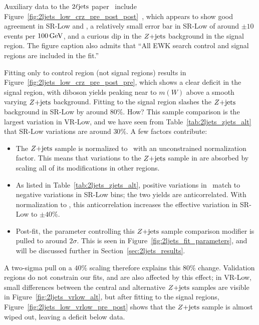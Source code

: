 Auxiliary data to the $\twoljets$ paper~\cite{atlas2022searches} include
Figure~\ref{fig:2ljets_low_crz_pre_post_post}~\cite{hepdata.116034.v1/t101},
which appears to show good agreement in SR-Low and \crz, a relatively
small error bar in SR-Low of around $\pm10$ events per $100\,\eV[G]$,
and a curious dip in the $\zjets$ background in the signal region.
The figure caption also admits that
``All EWK search control and signal regions are included in the fit.''

Fitting only to control region (not signal regions) results in
Figure~\ref{fig:2ljets_low_crz_pre_post_pre}, which shows a clear deficit in
the signal region, with diboson yields peaking near to $m(W)$ above a smooth
varying $\zjets$ background.
Fitting to the signal region slashes the $\zjets$ background in SR-Low by
around $80\%$. How?
This sample comparison is the largest variation in VR-Low, and we have seen
from Table~\ref{tab:2ljets_zjets_alt} that SR-Low variations are around $30\%$.
A few factors contribute:
\begin{itemize}
\item The $\zjets$ sample is normalized to \crz\ with an unconstrained
normalization factor. This means that variations to the $\zjets$ sample in \crz
are absorbed by scaling all of its modifications in other regions.
\item As listed in Table~\ref{tab:2ljets_zjets_alt}, positive variations
in \crz\ match to negative variations in SR-Low bins; the two yields are
anticorrelated.
With normalization to \crz, this anticorrelation increases the effective
variation in SR-Low to $\pm40\%$.
\item Post-fit, the parameter controlling this $\zjets$ sample comparison
modifier is pulled to around $2\sigma$. This is seen in
Figure~\ref{fig:2ljets_fit_parameters}, and will be discussed further in
Section~\ref{sec:2ljets_results}.
\end{itemize}
A two-sigma pull on a $40\%$ scaling therefore explains this $80\%$ change.
Validation regions do not constrain our fits, and are also affected by
this effect; in VR-Low, small differences between the central and alternative
$\zjets$ samples are visible in Figure~\ref{fig:2ljets_vrlow_alt}, but
after fitting to the signal regions,
Figure~\ref{fig:2ljets_low_vrlow_pre_post} shows that the $\zjets$ sample
is almost wiped out, leaving a deficit below data.

